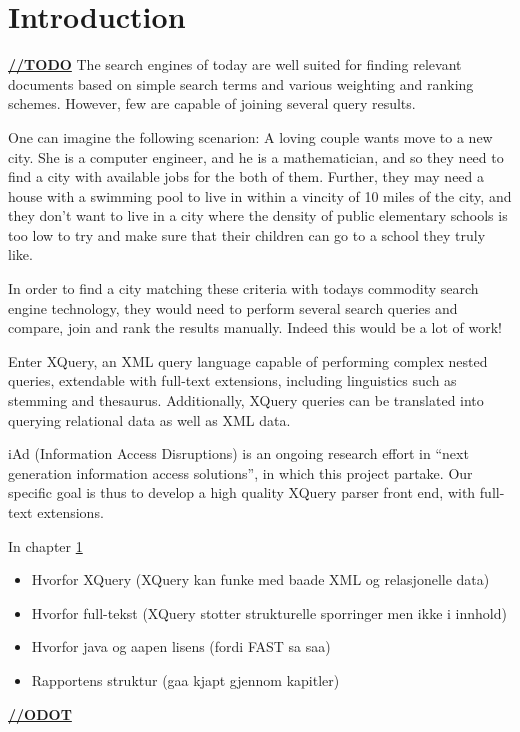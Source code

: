 \chapter{Introduction}
\underline{\textbf{\LARGE //TODO}}
The search engines of today are well suited for finding relevant documents based
on simple search terms and various weighting and ranking schemes. However, few 
are capable of joining several query results.

One can imagine the following scenarion: A loving couple wants move to a new city.
She is a computer engineer, and he is a mathematician, and so they need  to find
a city with available jobs for the both of them. Further, they may need a house
with a swimming pool to live in within a vincity of 10 miles of the city, and
they don't want to live in a city where the density of public elementary schools
is too low to try and make sure that their children can go to a school they
truly like.

In order to find a city matching these criteria with todays commodity search
engine technology, they would need to perform several search queries and
compare, join and rank the results manually. Indeed this would be a lot of work!

Enter XQuery, an XML query language capable of performing complex nested
queries, extendable with full-text extensions, including linguistics such as
stemming and thesaurus. Additionally, XQuery queries can be translated into
querying relational data as well as XML data.

iAd \cite{iadcentre} (Information Access Disruptions) is an ongoing research
effort in ``next generation information access solutions'', in which this
project partake. Our specific goal is thus to develop a high quality XQuery
parser front end, with full-text extensions.

In chapter \ref{}

\begin{itemize}
\item Hvorfor XQuery (XQuery kan funke med baade XML og relasjonelle data)
\item Hvorfor full-tekst (XQuery stotter strukturelle sporringer men ikke i innhold)
\item Hvorfor java og aapen lisens (fordi FAST sa saa)
\item Rapportens struktur (gaa kjapt gjennom kapitler)
\end{itemize}

\underline{\textbf{\LARGE //ODOT}}